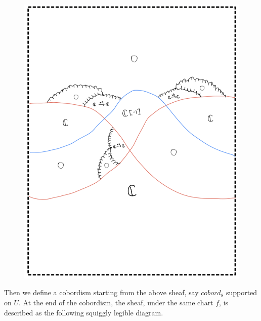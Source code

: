 \begin{figure}[H]
    \centering
    \includegraphics[scale = 0.95]{diagrams/cobord8/1.png}
    \caption{}
    \label{fig:your-label}
\end{figure}

Then we define a cobordism starting from the above sheaf, say $cobord_8$ supported on $U$. At the end of the cobordism, the sheaf, under the same chart $f$, is described as the following squiggly legible diagram.

